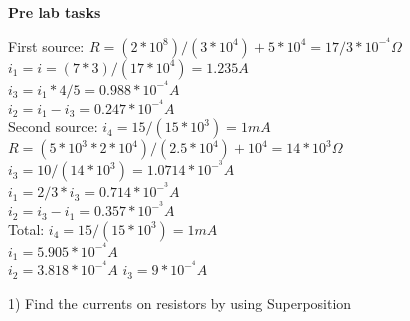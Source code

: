 \documentclass{article}
\begin{document}
\begin{flushleft}
\textbf{Pre lab tasks}
\end{flushleft}

\begin{flushleft}
First source: $R = (2 * 10^8)/(3*10^4) + 5 * 10^4 = 17/3 * 10^-^4  \Omega$\\
    $i_1 = i = (7 * 3) /(17 * 10^4) = 1.235 A$\\
    $i_3 = i_1 * 4/5 = 0.988 * 10^-^4 A$\\
    $i_2 = i_1 - i_3 = 0.247 * 10^-^4 A$\\

    Second source: $i_4 = 15/ (15 * 10^3) = 1 mA$\\ 
    $R = (5 * 10^3 * 2 * 10^4) / (2.5 * 10^4) + 10^4 = 14 * 10^3 \Omega$\\
    $i_3 = 10 / (14 * 10^3) = 1.0714 * 10^-^3 A$\\
    $i_1 = 2/3 * i_3 = 0.714 * 10^-^3 A$\\
    $i_2 = i_3 - i_1 = 0.357 * 10^-^3 A$\\

    Total: $i_4 = 15/ (15 * 10^3) = 1 mA$\\
    $i_1 = 5.905*10^-^4 A$\\
    $i_2 = 3.818 * 10 ^-^4 A$
    $i_3 = 9* 10^-^4 A$
    \break \break
\end{flushleft}



\begin{flushleft}
1) Find the currents on resistors by using Superposition    
\end{flushleft}
\end{document}
